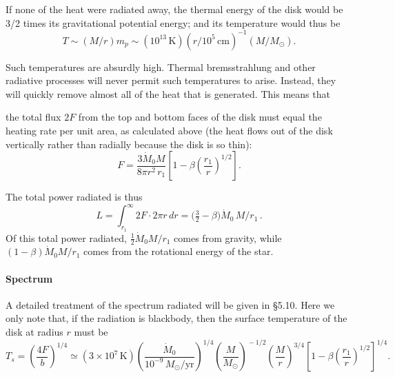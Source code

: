If none of the heat were radiated away, the thermal energy of the disk
would be 3/2 times its gravitational potential energy; and its temperature
would thus be
\[
T \sim (M/r) m_p \sim (10^{13}\,\text{K})(r/10^5\,\text{cm})^{-1}(M/M_\odot).
\]

Such temperatures are absurdly high. Thermal bremsstrahlung and other
radiative processes will never permit such temperatures to arise. Instead, they
will quickly remove almost all of the heat that is generated. This means that


the total flux $2F$ from the top and bottom faces of the disk must equal the
heating rate per unit area, as calculated above (the heat flows out of the disk
vertically rather than radially because the disk is so thin):
\begin{equation}
F = \frac{3\dot{M}_0 M}{8\pi r^2\,r_1}
    \left[1-\beta\!\left(\frac{r_1}{r}\right)^{\!1/2}\right].
\tag{5.2.19}
\end{equation}

The total power radiated is thus
\begin{equation}
L = \int_{r_1}^{\infty} 2F\cdot 2\pi r\,dr
  = \bigl(\tfrac{3}{2}-\beta\bigr)\dot{M}_0\,M/r_1\,.
\tag{5.2.20}
\end{equation}
Of this total power radiated, $\frac{1}{2}\dot{M}_0 M/r_1$ comes from gravity, while
$(1-\beta)\dot{M}_0 M/r_1$ comes from the rotational energy of the star.

\paragraph*{Spectrum}

A detailed treatment of the spectrum radiated will be given in \S5.10. Here we
only note that, if the radiation is blackbody, then the surface temperature of
the disk at radius $r$ must be
\begin{equation}
T_s = \left(\frac{4F}{b}\right)^{\!1/4}
\simeq (3\times 10^7\,\text{K})
\left(\frac{\dot{M}_0}{10^{-9}\,M_\odot/\text{yr}}\right)^{\!1/4}
\!\left(\frac{M}{M_\odot}\right)^{\!-1/2}
\!\left(\frac{M}{r}\right)^{\!3/4}
\left[1-\beta\!\left(\frac{r_1}{r}\right)^{\!1/2}\right]^{1/4}.
\tag{5.2.21}
\end{equation}

